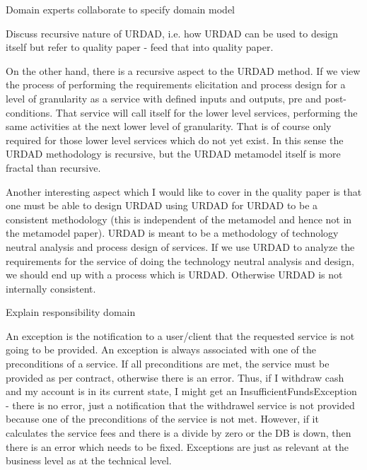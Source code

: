 Domain experts collaborate to specify domain model

Discuss recursive nature of URDAD, i.e. how URDAD can be used to design itself but refer to quality paper - feed that into quality paper.

On the other hand, there is a recursive aspect to the URDAD method. If
we view the process of performing the requirements elicitation and
process design for  a level of granularity as a service with defined
inputs and outputs, pre and post-conditions. That service will call
itself for the lower level services, performing the same activities at
the next lower level of granularity. That is of course only required for
those lower level services which do not yet exist. In this sense the
URDAD methodology is recursive, but the URDAD metamodel itself is more
fractal than recursive.

Another interesting aspect which I would like to cover in the quality
paper is that one must be able to design URDAD using URDAD for URDAD to
be a consistent methodology (this is independent of the metamodel and
hence not in the metamodel paper). URDAD is meant to be a methodology of
technology neutral analysis and process design of services. If we use
URDAD to analyze the requirements for the service of doing the
technology neutral analysis and design, we should end up with a process
which is URDAD. Otherwise URDAD is not internally consistent.


Explain responsibility domain

An exception is the notification to a user/client that the requested service is not going to be provided. An exception is always associated with one of the preconditions of a service. If all preconditions are met, the service must be provided as per contract, otherwise there is an error. Thus, if I withdraw cash and my account is in its current state, I might get an InsufficientFundsException - there is no error, just a notification that the withdrawel service is not provided because one of the preconditions of the service is not met. However, if it calculates the service fees and there is a divide by zero or the DB is down, then there is an error which needs to be fixed. Exceptions are just as relevant at the business level as at the technical level.





